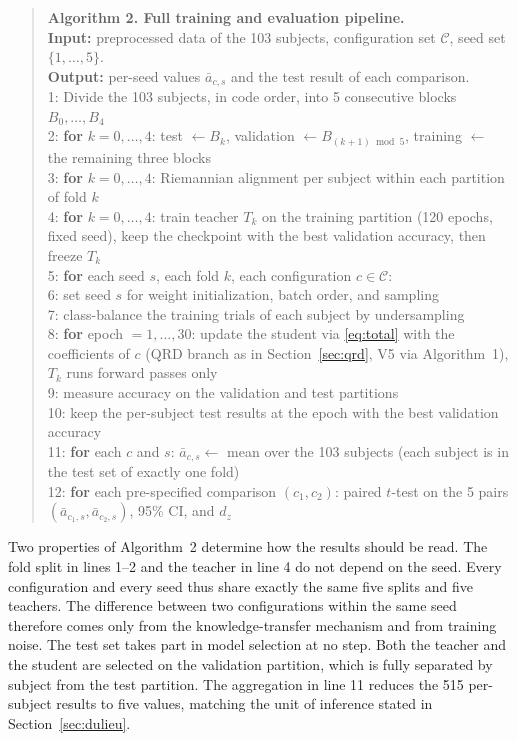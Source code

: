 \begin{quote}
\ttfamily\small\raggedright
\noindent\textbf{Algorithm 2. Full training and evaluation pipeline.}\\[2pt]
\textbf{Input:} preprocessed data of the 103 subjects, configuration
set $\mathcal{C}$, seed set $\{1,\ldots,5\}$.\\
\textbf{Output:} per-seed values $\bar{a}_{c,s}$ and the test result
of each comparison.\\[4pt]
1: \quad Divide the 103 subjects, in code order, into 5 consecutive
blocks $B_0,\ldots,B_4$\\
2: \quad \textbf{for} $k = 0,\ldots,4$: test $\leftarrow B_k$,
validation $\leftarrow B_{(k+1) \bmod 5}$, training $\leftarrow$ the
remaining three blocks\\
3: \quad \textbf{for} $k = 0,\ldots,4$: Riemannian alignment per
subject within each partition of fold $k$\\
4: \quad \textbf{for} $k = 0,\ldots,4$: train teacher $T_k$ on the
training partition (120 epochs, fixed seed), keep the checkpoint with
the best validation accuracy, then freeze $T_k$\\[4pt]
5: \quad \textbf{for} each seed $s$, each fold $k$, each configuration
$c \in \mathcal{C}$:\\
6: \quad \quad set seed $s$ for weight initialization, batch order,
and sampling\\
7: \quad \quad class-balance the training trials of each subject by
undersampling\\
8: \quad \quad \textbf{for} epoch $= 1,\ldots,30$: update the student
via \eqref{eq:total} with the coefficients of $c$ (QRD branch as in
Section~\ref{sec:qrd}, V5 via Algorithm~1), $T_k$ runs forward passes
only\\
9: \quad \quad \quad measure accuracy on the validation and test
partitions\\
10: \quad \quad keep the per-subject test results at the epoch with
the best validation accuracy\\[4pt]
11: \quad \textbf{for} each $c$ and $s$: $\bar{a}_{c,s} \leftarrow$
mean over the 103 subjects (each subject is in the test set of exactly
one fold)\\
12: \quad \textbf{for} each pre-specified comparison $(c_1, c_2)$:
paired $t$-test on the 5 pairs $(\bar{a}_{c_1,s}, \bar{a}_{c_2,s})$,
95\% CI, and $d_z$
\end{quote}

Two properties of Algorithm~2 determine how the results should be
read. The fold split in lines 1--2 and the teacher in line 4 do not depend on
the seed. Every configuration and every seed thus share exactly the same
five splits and five teachers. The difference between
two configurations within the same seed therefore comes only from the
knowledge-transfer mechanism and from training noise. The test set
takes part in model selection at no step. Both the teacher and the
student are selected on the validation partition, which is fully
separated by subject from the test partition. The aggregation in line
11 reduces the 515 per-subject results to five values, matching the
unit of inference stated in Section~\ref{sec:dulieu}.

